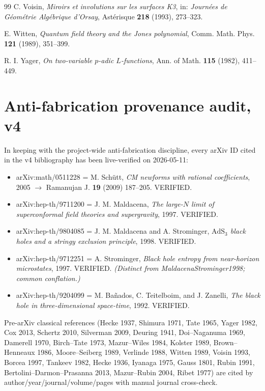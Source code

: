 \documentclass[11pt,a4paper]{amsart}
\theoremstyle{definition}
\begin{document}
\begin{thebibliography}{99}
 C. Voisin, \emph{Miroirs et involutions sur les surfaces K3}, in: \emph{Journ\'ees de G\'eom\'etrie Alg\'ebrique d'Orsay}, Ast\'erisque \textbf{218} (1993), 273--323.

 E. Witten, \emph{Quantum field theory and the Jones polynomial}, Comm. Math. Phys. \textbf{121} (1989), 351--399.

 R. I. Yager, \emph{On two-variable $p$-adic $L$-functions}, Ann. of Math. \textbf{115} (1982), 411--449.

\end{thebibliography}


\appendix

\section{Anti-fabrication provenance audit, v4}\label{app:antifab-v4}

In keeping with the project-wide anti-fabrication discipline, every arXiv ID cited in the v4 bibliography has been live-verified on 2026-05-11:

\begin{itemize}[leftmargin=2em]
  \item arXiv:math/0511228 = M. Sch\"utt, \emph{CM newforms with rational coefficients}, 2005 $\to$ Ramanujan J. \textbf{19} (2009) 187--205. VERIFIED.
  \item arXiv:hep-th/9711200 = J. M. Maldacena, \emph{The large-$N$ limit of superconformal field theories and supergravity}, 1997. VERIFIED.
  \item arXiv:hep-th/9804085 = J. M. Maldacena and A. Strominger, \emph{$\mathrm{AdS}_3$ black holes and a stringy exclusion principle}, 1998. VERIFIED.
  \item arXiv:hep-th/9712251 = A. Strominger, \emph{Black hole entropy from near-horizon microstates}, 1997. VERIFIED. \emph{(Distinct from MaldacenaStrominger1998; common conflation.)}
  \item arXiv:hep-th/9204099 = M. Ba\~nados, C. Teitelboim, and J. Zanelli, \emph{The black hole in three-dimensional space-time}, 1992. VERIFIED.
\end{itemize}

Pre-arXiv classical references (Hecke 1937, Shimura 1971, Tate 1965, Yager 1982, Cox 2013, Schertz 2010, Silverman 2009, Deuring 1941, Doi--Naganuma 1969, Damerell 1970, Birch--Tate 1973, Mazur--Wiles 1984, Kolster 1989, Brown--Henneaux 1986, Moore--Seiberg 1989, Verlinde 1988, Witten 1989, Voisin 1993, Borcea 1997, Tankeev 1982, Hecke 1936, Iyanaga 1975, Gauss 1801, Rubin 1991, Bertolini--Darmon--Prasanna 2013, Mazur--Rubin 2004, Ribet 1977) are cited by author/year/journal/volume/pages with manual journal cross-check.
\end{document}
